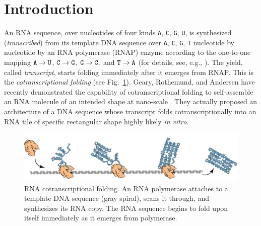 	\section{Introduction}

An RNA sequence, over nucleotides of four kinds {\tt A}, {\tt C}, {\tt G}, {\tt U}, is synthesized (\textit{transcribed}) from its template DNA sequence over {\tt A}, {\tt C}, {\tt G}, {\tt T} nucleotide by nucleotide by an RNA polymerase (RNAP) enzyme according to the one-to-one mapping ${\tt A} \to {\tt U}$, ${\tt C} \to {\tt G}$, ${\tt G} \to {\tt C}$, and ${\tt T} \to {\tt A}$ (for details, see, e.g., \cite{AJLMRRW2014}). 
The yield, called \textit{transcript}, starts folding immediately after it emerges from RNAP. 
This is the \textit{cotranscriptional folding} (see Fig.~\ref{fig:rna_origami}). 
Geary, Rothemund, and Andersen have recently demonstrated the capability of cotranscriptional folding to self-assemble an RNA molecule of an intended shape at nano-scale \cite{GearyRothemundAndersen2014}. 
They actually proposed an architecture of a DNA sequence whose transcript folds cotranscriptionally into an RNA tile of specific rectangular shape highly likely \textit{in vitro}. 

\begin{figure}[tb]
\centering
\includegraphics[width=0.8\linewidth]{pic/rna_origami.pdf}
\caption{RNA cotranscriptional folding. 
An RNA polymerase attaches to a template DNA sequence (gray spiral), scans it through, and synthesizes its RNA copy. 
The RNA sequence begins to fold upon itself immediately as it emerges from polymerase. 
}
\label{fig:rna_origami}
\end{figure}

